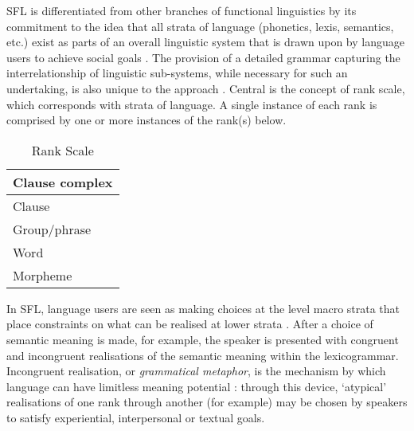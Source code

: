 	  SFL is differentiated from other branches of functional linguistics by its commitment to the idea that all strata of language (phonetics, lexis, semantics, etc.) exist as parts of an overall linguistic system that is drawn upon by language users to achieve social goals \cite{halliday_language_1994}. The provision of a detailed grammar capturing the interrelationship of linguistic sub-systems, while necessary for such an undertaking, is also unique to the approach \cite{eggins_introduction_2004}. Central is the concept of rank scale, which corresponds with strata of language. A single instance of each rank is comprised by one or more instances of the rank(s) below.

	  \begin{table}[ht]
	  \centering
		  \begin{tabular}{|l|}
		  \hline
		  Clause complex \\ \hline
		  Clause		 \\ \hline
		  Group/phrase   \\ \hline
		  Word		   \\ \hline
		  Morpheme	   \\ \hline
		  \end{tabular}
		  \caption{Rank Scale}
	  \end{table}


	  In SFL, language users are seen as making choices at the level macro strata that place constraints on what can be realised at lower strata \cite{martin_genre_2006}. After a choice of semantic meaning is made, for example, the speaker is presented with congruent and incongruent realisations of the semantic meaning within the lexicogrammar. Incongruent realisation, or \emph{grammatical metaphor}, is the mechanism by which language can have limitless meaning potential \cite{heyvaert_nominalization_2003}: through this device, `atypical' realisations of one rank through another (for example) may be chosen by speakers to satisfy experiential, interpersonal or textual goals. 



